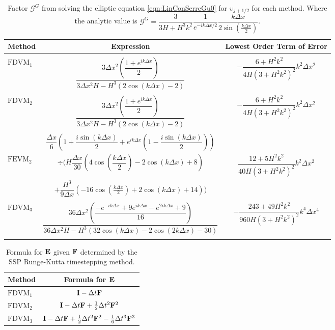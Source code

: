 \begin{landscape}
\begin{table}
\begin{tabular}{l  c  c}
		Method& Expression& Lowest Order Term of Error \T \B\\
		\hline  \\
		$\text{FDVM}_1$& $\dfrac{3 \Delta x^2 \left(\dfrac{1 + e^{ik\Delta x}}{2}\right)}{3 \Delta x^2 H - H^3 \left(2\cos\left(k\Delta x\right) - 2\right)}$ & $-\dfrac{6 +H^2k^2}{4H \left(3 + H^2k^2\right)^2}k^2 \Delta x^2$  \\ \\
		$\text{FDVM}_2$& $\dfrac{3 \Delta x^2 \left(\dfrac{1 + e^{ik\Delta x}}{2}\right)}{3 \Delta x^2 H - H^3 \left(2\cos\left(k\Delta x\right) - 2\right)}$ & $-\dfrac{6 +H^2k^2}{4H \left(3 + H^2k^2\right)^2}k^2 \Delta x^2$  \\ \\
		& $\dfrac{\Delta x}{6} \left(1 + \dfrac{i \sin\left(k \Delta x\right)}{2} + e^{ik\Delta x}\left(1 - \dfrac{i \sin\left(k \Delta x\right)}{2}\right) \right)$ & \\  $\text{FEVM}_2$ & $\div  \Bigg( H\dfrac{\Delta x}{30} \left(4\cos\left(\dfrac{k \Delta x}{2}\right) - 2\cos\left({k \Delta x}\right) + 8\right) $  & $\dfrac{12 + 5H^2k^2}{40H \left(3 + H^2k^2\right)^2}k^2 \Delta x^2$ \\ &$+ \dfrac{H^3 }{9\Delta x}\left(-16\cos\left(\frac{k\Delta x}{2}\right) + 2 \cos\left(k \Delta x\right) + 14\right)    \Bigg)$ & \\ \\
		$\text{FDVM}_3$&  $\dfrac{36 \Delta x^2 \left(\dfrac{-e^{-ik\Delta x} + 9e^{ik\Delta x} - e^{2ik\Delta x} + 9}{16}\right)}{36 \Delta x^2H - H^3\left(32\cos\left(k \Delta x\right) -2\cos\left(2k \Delta x\right) - 30\right)}$ & $-\dfrac{243 + 49H^2k^2}{960H\left(3 + H^2k^2\right)^2}k^4 \Delta x^4$  \\ \\ 
		\hline
	\end{tabular}
	\caption{Factor $\mathcal{G}^G$ from solving the elliptic equation \eqref{eqn:LinConSerreGu0} for $\upsilon_{j+1/2}$ for each method. Where the analytic value is  $\mathcal{G}^G = \dfrac{3}{3H + H^3k^2} \dfrac{1}{e^{-ik\Delta x/2}} \dfrac{k\Delta x}{2 \sin\left(\frac{k \Delta x}{2}\right)}$.}
	\label{tab:GGfactor} 
\end{table}
\end{landscape}
%
\begin{table}
	\centering
	\begin{tabular}{l  c}
		Method & Formula for $\mathbf{E}$  \T\B \\
		\hline 
		$\text{FDVM}_1$& $\mathbf{I} - \Delta t\mathbf{F} $  \T\B \\
		$\text{FDVM}_2$& $ \mathbf{I}  -\Delta t\mathbf{F} + \frac{1}{2}\Delta t^2\mathbf{F}^2$  \T\B \\
		$\text{FDVM}_3$& $\mathbf{I} -\Delta t\mathbf{F} + \frac{1}{2}\Delta t^2 \mathbf{F}^2 - \frac{1}{6}\Delta t^3 \mathbf{F}^3 $  \T\B \\
		\hline
	\end{tabular}
	\caption{Formula for $\mathbf{E}$ given $\mathbf{F}$ determined by the SSP Runge-Kutta timestepping method.}
	\label{tab:RKstepfactor}
\end{table}

